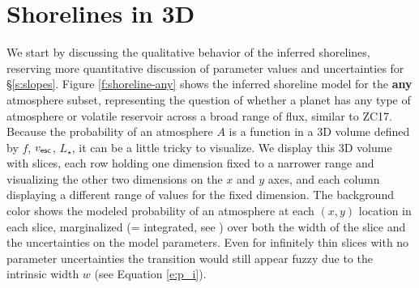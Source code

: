 \documentclass[modern,linenumbers,trackchanges]{aastex7}
\begin{document}
\section{Shorelines in 3D}
\label{s:shorelines}

We start by discussing the qualitative behavior of the inferred shorelines, reserving more quantitative discussion of parameter values and uncertainties for \S\ref{s:slopes}. Figure \ref{f:shoreline-any} shows the inferred shoreline model for the {\bf any} atmosphere subset, representing the question of whether a planet has any type of atmosphere or volatile reservoir across a broad range of flux, similar to ZC17. Because the probability of an atmosphere $A$ is a function in a 3D volume defined by $f$, $v_{\sf esc}$, $L_\star$, it can be a little tricky to visualize. We display this 3D volume with slices, each row holding one dimension fixed to a narrower range and visualizing the other two dimensions on the $x$ and $y$ axes, and each column displaying a different range of values for the fixed dimension. The background color shows the modeled probability of an atmosphere at each $(x, y)$ location in each slice, marginalized (= integrated, see \citealt{hoggDataAnalysisRecipes2010a, siviaDataAnalysisBayesian2011, vanderplasFrequentismBayesianismPythondriven2014a, ivezicStatisticsDataMining2020}) over both the width of the slice and the uncertainties on the model parameters. Even for infinitely thin slices with no parameter uncertainties the transition would still appear fuzzy due to the intrinsic width $w$ (see Equation \ref{e:p_i}). 
\end{document}
